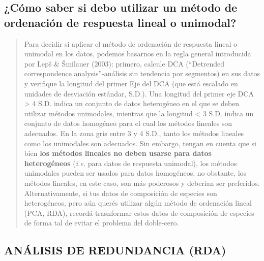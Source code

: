 \documentclass[
]{book}
\begin{document}
\hypertarget{cuxf3mo-saber-si-debo-utilizar-un-muxe9todo-de-ordenaciuxf3n-de-respuesta-lineal-o-unimodal}{%
\subsection{¿Cómo saber si debo utilizar un método de ordenación de respuesta lineal o unimodal?}\label{cuxf3mo-saber-si-debo-utilizar-un-muxe9todo-de-ordenaciuxf3n-de-respuesta-lineal-o-unimodal}}

\begin{quote}
Para decidir si aplicar el método de ordenación de respuesta lineal o unimodal en los datos, podemos basarnos en la regla general introducida por Lepš \& Šmilauer (2003): primero, calcule DCA (``Detrended correspondence analysis''-análisis sin tendencia por segmentos) en sus datos y verifique la longitud del primer Eje del DCA (que está escalado en unidades de desviación estándar, S.D.). Una longitud del primer eje DCA \textgreater{} 4 S.D. indica un conjunto de datos heterogéneo en el que se deben utilizar métodos unimodales, mientras que la longitud \textless{} 3 S.D. indica un conjunto de datos homogéneo para el cual los métodos lineales son adecuados. En la zona gris entre 3 y 4 S.D., tanto los métodos lineales como los unimodales son adecuados. Sin embargo, tengan en cuenta que si bien \textbf{los métodos lineales no deben usarse para datos heterogéneos} (\emph{i.e.} para datos de respuesta unimodal), los métodos unimodales pueden ser usados para datos homogéneos, no obstante, los métodos lineales, en este caso, son más poderosos y deberían ser preferidos.
Alternativamente, si tus datos de composición de especies son heterogéneos, pero aún querés utilizar algún método de ordenación lineal (PCA, RDA), recordá trasnformar estos datos de composición de especies de forma tal de evitar el problema del doble-cero.
\end{quote}

\hypertarget{anuxe1lisis-de-redundancia-rda}{%
\subsection{\texorpdfstring{\textbf{ANÁLISIS DE REDUNDANCIA (RDA)}}{ANÁLISIS DE REDUNDANCIA (RDA)}}\label{anuxe1lisis-de-redundancia-rda}}
\end{document}
